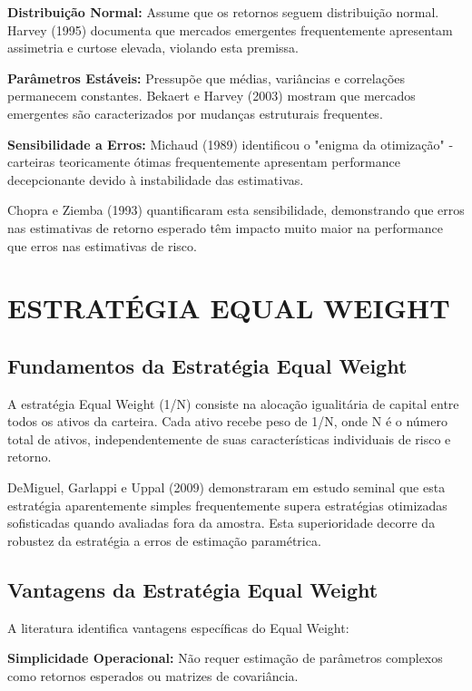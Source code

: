 \textbf{Distribuição Normal:} Assume que os retornos seguem distribuição normal. Harvey (1995) documenta que mercados emergentes frequentemente apresentam assimetria e curtose elevada, violando esta premissa.

\textbf{Parâmetros Estáveis:} Pressupõe que médias, variâncias e correlações permanecem constantes. Bekaert e Harvey (2003) mostram que mercados emergentes são caracterizados por mudanças estruturais frequentes.

\textbf{Sensibilidade a Erros:} Michaud (1989) identificou o "enigma da otimização" - carteiras teoricamente ótimas frequentemente apresentam performance decepcionante devido à instabilidade das estimativas.

Chopra e Ziemba (1993) quantificaram esta sensibilidade, demonstrando que erros nas estimativas de retorno esperado têm impacto muito maior na performance que erros nas estimativas de risco.

\section{ESTRATÉGIA EQUAL WEIGHT}

\subsection{Fundamentos da Estratégia Equal Weight}

A estratégia Equal Weight (1/N) consiste na alocação igualitária de capital entre todos os ativos da carteira. Cada ativo recebe peso de 1/N, onde N é o número total de ativos, independentemente de suas características individuais de risco e retorno.

DeMiguel, Garlappi e Uppal (2009) demonstraram em estudo seminal que esta estratégia aparentemente simples frequentemente supera estratégias otimizadas sofisticadas quando avaliadas fora da amostra. Esta superioridade decorre da robustez da estratégia a erros de estimação paramétrica.

\subsection{Vantagens da Estratégia Equal Weight}

A literatura identifica vantagens específicas do Equal Weight:

\textbf{Simplicidade Operacional:} Não requer estimação de parâmetros complexos como retornos esperados ou matrizes de covariância.

